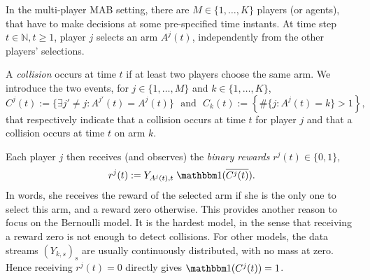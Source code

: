 


In the multi-player MAB setting, there are $M \in \{1,\dots,K\}$ players (or agents),
that have to make decisions at some pre-specified time instants.
At time step $t \in\mathbb{N},t\geq1$, player $j$ selects an arm $A^j(t)$, independently from the other players' selections.

\begin{definition}
  A \emph{collision} occurs at time $t$ if at least two players choose the same arm.
  We introduce the two events, for $j\in\{1,\dots,M\}$ and $k\in\{1,\dots,K\}$,
  \begin{equation}
    C^j(t) :=  \{ \exists j' \neq j : A^{j'}(t) = A^j(t) \}
    \ \ \ \text{and} \ \ \ C_k(t) :=  \left\{ \# \{ j : A^j(t) = k\} > 1 \right\},
  \end{equation}
  that respectively indicate that a collision occurs at time $t$ for player $j$ and that a collision occurs at time $t$ on arm $k$.
\end{definition}

Each player $j$ then receives (and observes) the \emph{binary rewards}
$r^j(t) \in \{0,1\}$,
\begin{equation}
  r^j(t) := Y_{A^j(t),t} \; \indic(\overline{C^j(t)}).
\end{equation}
In words, she receives the reward of the selected arm if she is the only one to select this arm, and a reward zero otherwise.
This provides another reason to focus on the Bernoulli model. It is the hardest model, in the sense that receiving a reward zero is not enough to detect collisions. For other models, the data streams $(Y_{k,s})_s$ are usually continuously distributed, with no mass at zero. Hence receiving $r^j(t) = 0$ directly gives $\indic(C^j(t)) = 1$.

